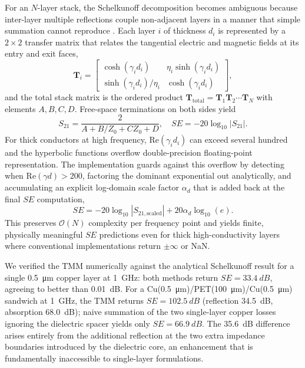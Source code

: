 \documentclass[review,3p,authoryear]{elsarticle}
\begin{document}
For an $N$-layer stack, the Schelkunoff decomposition becomes ambiguous because inter-layer multiple reflections couple non-adjacent layers in a manner that simple summation cannot reproduce \citep{Yeh1988, Celozzi2008}. Each layer $i$ of thickness $d_i$ is represented by a $2 \times 2$ transfer matrix that relates the tangential electric and magnetic fields at its entry and exit faces,
\begin{equation}
\mathbf{T}_i = \begin{bmatrix}
\cosh(\gamma_i d_i) & \eta_i \sinh(\gamma_i d_i) \\
\sinh(\gamma_i d_i) / \eta_i & \cosh(\gamma_i d_i)
\end{bmatrix},
\label{eq:tmm}
\end{equation}
and the total stack matrix is the ordered product $\mathbf{T}_{\mathrm{total}} = \mathbf{T}_1\mathbf{T}_2\cdots\mathbf{T}_N$ with elements $A,B,C,D$. Free-space terminations on both sides yield
\begin{equation}
S_{21} = \frac{2}{A + B/Z_0 + CZ_0 + D},
\quad SE = -20\log_{10}|S_{21}|.
\label{eq:s21}
\end{equation}
For thick conductors at high frequency, $\mathrm{Re}(\gamma_i d_i)$ can exceed several hundred and the hyperbolic functions overflow double-precision floating-point representation. The implementation guards against this overflow by detecting when $\mathrm{Re}(\gamma d) > 200$, factoring the dominant exponential out analytically, and accumulating an explicit log-domain scale factor $\alpha_d$ that is added back at the final $SE$ computation,
\begin{equation}
SE = -20\log_{10}|S_{21,\mathrm{scaled}}| + 20\alpha_d \log_{10}(e).
\label{eq:overflow}
\end{equation}
This preserves $\mathcal{O}(N)$ complexity per frequency point and yields finite, physically meaningful $SE$ predictions even for thick high-conductivity layers where conventional implementations return $\pm\infty$ or NaN.

We verified the TMM numerically against the analytical Schelkunoff result for a single \SI{0.5}{\micro\metre} copper layer at \SI{1}{GHz}: both methods return $SE = \SI{33.4}{dB}$, agreeing to better than \SI{0.01}{dB}. For a Cu(\SI{0.5}{\micro\metre})/PET(\SI{100}{\micro\metre})/Cu(\SI{0.5}{\micro\metre}) sandwich at \SI{1}{GHz}, the TMM returns $SE = \SI{102.5}{dB}$ (reflection \SI{34.5}{dB}, absorption \SI{68.0}{dB}); naive summation of the two single-layer copper losses ignoring the dielectric spacer yields only $SE = \SI{66.9}{dB}$. The \SI{35.6}{dB} difference arises entirely from the additional reflection at the two extra impedance boundaries introduced by the dielectric core, an enhancement that is fundamentally inaccessible to single-layer formulations.
\end{document}

